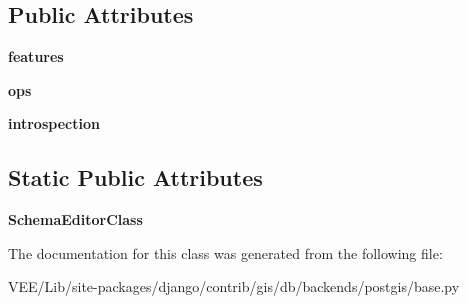 \subsection*{Public Attributes}
\begin{DoxyCompactItemize}
\item 
\mbox{\label{classdjango_1_1contrib_1_1gis_1_1db_1_1backends_1_1postgis_1_1base_1_1_database_wrapper_ad5f991547f18acae8b635aeaa3996292}} 
{\bfseries features}
\item 
\mbox{\label{classdjango_1_1contrib_1_1gis_1_1db_1_1backends_1_1postgis_1_1base_1_1_database_wrapper_aa5de68667638bc2b15587a2524bc6200}} 
{\bfseries ops}
\item 
\mbox{\label{classdjango_1_1contrib_1_1gis_1_1db_1_1backends_1_1postgis_1_1base_1_1_database_wrapper_af964fb90ee1a7902e6ca25d4168f6b1c}} 
{\bfseries introspection}
\end{DoxyCompactItemize}
\subsection*{Static Public Attributes}
\begin{DoxyCompactItemize}
\item 
\mbox{\label{classdjango_1_1contrib_1_1gis_1_1db_1_1backends_1_1postgis_1_1base_1_1_database_wrapper_ac5d2ceed1527f811aae3bcf90a84fd5c}} 
{\bfseries Schema\+Editor\+Class}
\end{DoxyCompactItemize}


The documentation for this class was generated from the following file\+:\begin{DoxyCompactItemize}
\item 
V\+E\+E/\+Lib/site-\/packages/django/contrib/gis/db/backends/postgis/base.\+py\end{DoxyCompactItemize}

